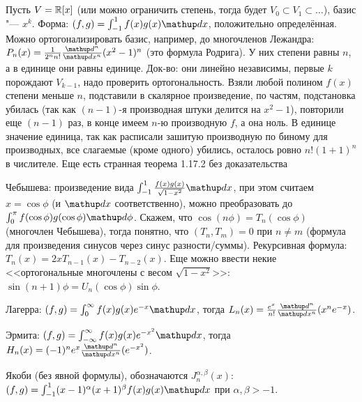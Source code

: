 \section{} %
Пусть $V=\mathbb{R}[x]$ (или можно ограничить степень, тогда будет $V_0 \subset V_1 \subset \dots$), базис "--- $x^k$.
Форма: $(f, g) = \int_{-1}^1 f(x)g(x) \d x$, положительно определённая.
Можно ортогонализировать базис, например, до многочленов Лежандра: $P_n(x) = \frac{1}{2^nn!}\frac{\d^n}{\d x^n}(x^2-1)^n$ (это формула Родрига).
У них степени равны $n$, а в единице они равны единице.
Док-во: они линейно независимы, первые $k$ порождают $V_{k-1}$, надо проверить ортогональность.
Взяли любой полином $f(x)$ степени меньше $n$, подставили в скалярное произведение,
по частям, подстановка убилась (так как $(n-1)$-я производная штуки делится на $x^2-1$),
повторили еще $(n-1)$ раз, в конце имеем $n$-ю производную $f$, а она ноль.
В единице значение единица, так как расписали зашитую производную по биному для производных, все слагаемые (кроме одного) убились, осталось ровно $n!(1+1)^n$ в числителе.
Еще есть странная теорема 1.17.2 без доказательства \TODO

Чебышева: произведение вида $\int_{-1}^1 \frac{f(x)g(x)}{\sqrt{1 - x^2}} \d x$, при этом считаем $x=\cos \phi$ (и $\d x$ соответственно),
можно преобразовать до $\int_0^{\pi} f(\cos \phi)g(\cos \phi) \d \phi$.
Скажем, что $\cos(n\phi)=T_n(\cos\phi)$ (многочлен Чебышева), тогда понятно, что $(T_n, T_m)=0$ при $n \ne m$ (формула для произведения синусов через синус разности/суммы).
Рекурсивная формула: $T_n(x)=2xT_{n-1}(x)-T_{n-2}(x)$.
Еще можно ввести некие <<ортогональные многочлены с весом $\sqrt{1-x^2}$>>: $\sin(n+1)\phi = U_n(\cos \phi)\sin \phi$.

Лагерра: $(f,g)=\int_0^\infty f(x)g(x)e^{-x}\d x$, тогда $L_n(x)=\frac{e^x}{n!}\frac{\d^n}{\d x^n}(x^ne^{-x})$.

Эрмита: $(f, g)=\int_{-\infty}^\infty f(x)g(x)e^{-x^2}\d x$, тогда $H_n(x) = (-1)^n e^x \frac{\d^n}{\d x^n}(e^{-x^2})$.

Якоби (без явной формулы), обозначаются $J_n^{\alpha,\beta}(x)$: $(f, g)=\int_{-1}^1 (x-1)^\alpha(x+1)^\beta f(x) g(x) \d x$ при $\alpha, \beta > -1$.

\TODO

\section{} %

\TODO

\section{} %

\TODO
